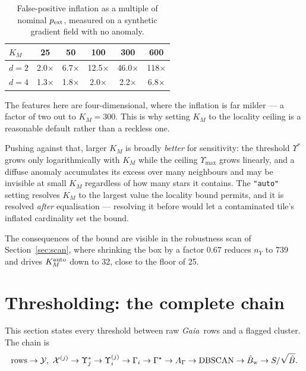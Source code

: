 \documentclass[11pt,a4paper]{article}
\newcommand{\Ycal}{\mathcal{Y}}              %
\newcommand{\Xcal}{\mathcal{X}}              %
\newcommand{\Ups}{\Upsilon}                  %
\newcommand{\Gam}{\Gamma}                    %
\newcommand{\Ups}{\Upsilon}
\newcommand{\Gam}{\Gamma}
\newcommand{\Gstar}{\Gamma^{\star}}
\newcommand{\Bhat}{\hat{B}}
\newcommand{\srb}{S/\sqrt{\Bhat}}
\newcommand{\Ycal}{\mathcal{Y}}
\newcommand{\Xcal}{\mathcal{X}}
\newcommand{\Gaia}{\textit{Gaia}}
\begin{document}
\begin{table}[h]
\centering\small
\caption{False-positive inflation as a multiple of nominal $p_{\rm ext}$, measured on a synthetic
gradient field with no anomaly.}
\begin{tabular}{@{}lccccc@{}}
\toprule
$K_M$ & 25 & 50 & 100 & 300 & 600\\
\midrule
$d = 2$ & 2.0$\times$ & 6.7$\times$ & 12.5$\times$ & 46.0$\times$ & 118$\times$\\
$d = 4$ & 1.3$\times$ & 1.8$\times$ & 2.0$\times$ & 2.2$\times$ & 6.8$\times$\\
\bottomrule
\end{tabular}
\end{table}

The features here are four-dimensional, where the inflation is far milder --- a factor of two out
to $K_M = 300$. This is why setting $K_M$ to the locality ceiling is a reasonable default rather
than a reckless one.

Pushing against that, larger $K_M$ is broadly \emph{better} for sensitivity: the threshold $\Ups^*$
grows only logarithmically with $K_M$ while the ceiling $\Ups_{\max}$ grows linearly, and a diffuse
anomaly accumulates its excess over many neighbours and may be invisible at small $K_M$ regardless
of how many stars it contains. The \texttt{"auto"} setting resolves $K_M$ to the largest value the
locality bound permits, and it is resolved \emph{after} equalisation --- resolving it before would
let a contaminated tile's inflated cardinality set the bound.

The consequences of the bound are visible in the robustness scan of Section~\ref{sec:scan}, where
shrinking the box by a factor $0.67$ reduces $n_Y$ to 739 and drives $K_M^{\rm auto}$ down to 32,
close to the floor of 25.

\section{Thresholding: the complete chain}
\label{sec:thresholding}

This section states every threshold between raw \Gaia\ rows and a flagged cluster. The chain is
%
\begin{equation*}
\text{rows} \rightarrow \Ycal,\ \Xcal^{(j)} \rightarrow \Ups^*_j \rightarrow \Ups_i^{(j)}
\rightarrow \Gam_i \rightarrow \Gstar \rightarrow A_\Gam \rightarrow \text{DBSCAN}
\rightarrow \Bhat_{\rm w} \rightarrow \srb.
\end{equation*}
\end{document}
